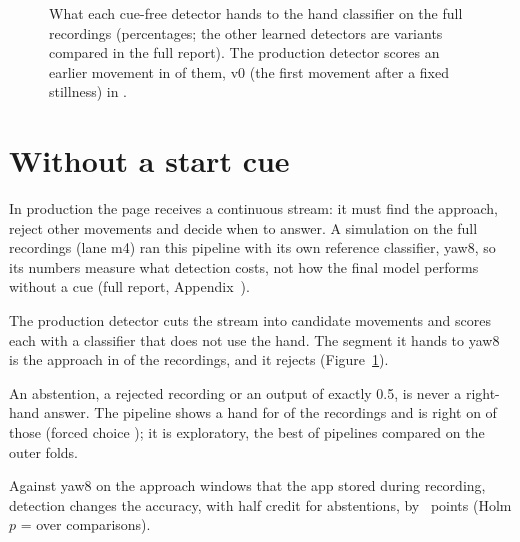 \begin{figure}[tbp]
\centering
{}
\caption{What each cue-free detector hands to the hand classifier on the  full recordings
(percentages; the other learned detectors are variants compared in the full report). The production detector scores an
earlier movement in  of them, v0 (the first movement after a fixed stillness) in
.}
\label{fig:M4_01_detection_outcomes}
\end{figure}

\section{Without a start cue}\label{sec:production}
In production the page receives a continuous stream: it must find the approach, reject other movements and decide
when to answer. A simulation on the  full recordings (lane m4) ran this pipeline with its own
reference classifier, yaw8, so its numbers measure what detection costs, not how the final model performs without a
cue (full report, Appendix~).

The production detector cuts the stream into candidate movements and scores each with a classifier that does not use
the hand. The segment it hands to yaw8 is the approach in  of the recordings, and it rejects
 (Figure~\ref{fig:M4_01_detection_outcomes}).

An abstention, a rejected recording or an output of exactly 0.5, is never a right-hand answer. The pipeline shows a
hand for  of the recordings and is right on  of those
(forced choice ); it is exploratory, the best of  pipelines compared on
the outer folds.

Against yaw8 on the approach windows that the app stored during recording, detection changes the accuracy, with half
credit for abstentions, by ~points (Holm $p$ =  over
 comparisons).


